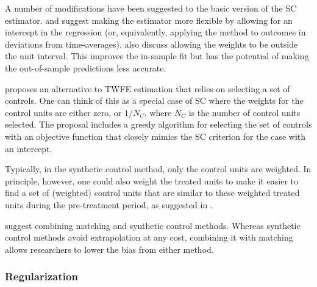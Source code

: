 \documentclass[letterpaper,12pt,leqno]{article}
\begin{document}
A number of modifications have been suggested to the basic version of the SC estimator.
\citep{hsiao2012panel, doudchenko2016balancing} and \citep{ferman2021synthetic} suggest making the estimator more flexible by allowing for an intercept in the regression (or, equivalently, applying the method to outcomes in deviations from time-averages). 
 \citep{hsiao2012panel, doudchenko2016balancing, gardeazabal2017empirical} also discuss allowing the weights to be outside the unit interval. This improves the in-sample fit but has the potential of making the out-of-sample predictions less accurate. 

\citep{li2023frontiers}
proposes an alternative to TWFE estimation that relies on selecting a set of controls. One can think of this as a special case of SC where the weights for the control units are either zero, or $1/N_C$, where $N_C$ is the number of control units selected. The proposal includes a greedy algorithm for selecting the set of controls with an objective function that closely mimics the SC criterion for the case with an intercept.

Typically, in the synthetic control method, only the control units are weighted. In principle, however, one could also weight the treated units to make it easier to find a set of (weighted)  control units that are similar to these weighted treated units during the pre-treatment period, as suggested in 
\citep{kuosmanen2021design}.


\citep{kellogg2021combining}
suggest combining matching and synthetic control methods. Whereas synthetic control methods avoid extrapolation at any cost, combining it with matching allows researchers to lower the bias from either method. 

\subsubsection{Regularization}
\end{document}
